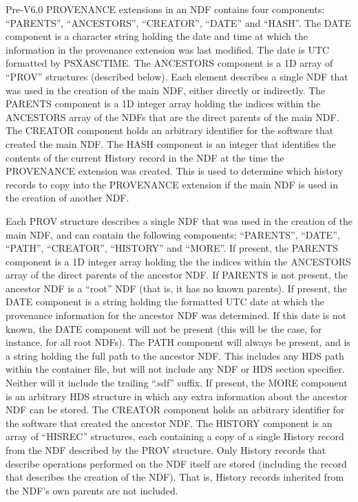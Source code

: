 \documentclass[twoside,11pt]{article}
\renewcommand{\_}{\texttt{\symbol{95}}}
\begin{document}
Pre-V6.0 PROVENANCE extensions in an NDF contains four components:
``PARENTS'', ``ANCESTORS'', ``CREATOR'', ``DATE'' and ``HASH''. The DATE
component is a character string holding the date and time at which the
information in the provenance extension was last modified. The date is
UTC formatted by PSX\_ASCTIME. The ANCESTORS component is a 1D array of
``PROV'' structures (described below). Each element describes a single
NDF that was used in the creation of the main NDF, either directly or
indirectly. The PARENTS component is a 1D integer array holding the
indices within the ANCESTORS array of the NDFs that are the direct
parents of the main NDF. The CREATOR component holds an arbitrary
identifier for the software that created the main NDF. The HASH component
is an integer that identifies the contents of the current History record
in the NDF at the time the PROVENANCE extension was created. This is used
to determine which history records to copy into the PROVENANCE extension
if the main NDF is used in the creation of another NDF.

Each PROV structure describes a single NDF that was used in the creation
of the main NDF, and can contain the following components; ``PARENTS'',
``DATE'', ``PATH'', ``CREATOR'', ``HISTORY'' and ``MORE''. If present, the PARENTS
component is a 1D integer array holding the the indices within the
ANCESTORS array of the direct parents of the ancestor NDF. If PARENTS is
not present, the ancestor NDF is a ``root'' NDF (that is, it has no known
parents). If present, the DATE component is a string holding the
formatted UTC date at which the provenance information for the ancestor
NDF was determined. If this date is not known, the DATE component will
not be present (this will be the case, for instance, for all root NDFs).
The PATH component will always be present, and is a string holding the
full path to the ancestor NDF. This includes any HDS path within the
container file, but will not include any NDF or HDS section specifier.
Neither will it include the trailing ``.sdf'' suffix. If present, the MORE
component is an arbitrary HDS structure in which any extra information
about the ancestor NDF can be stored. The CREATOR component holds an
arbitrary identifier for the software that created the ancestor NDF. The
HISTORY component is an array of ``HISREC'' structures, each containing a
copy of a single History record from the NDF described by the PROV
structure. Only History records that describe operations performed on the
NDF itself are stored (including the record that describes the creation
of the NDF). That is, History records inherited from the NDF's own
parents are not included.
\end{document}
